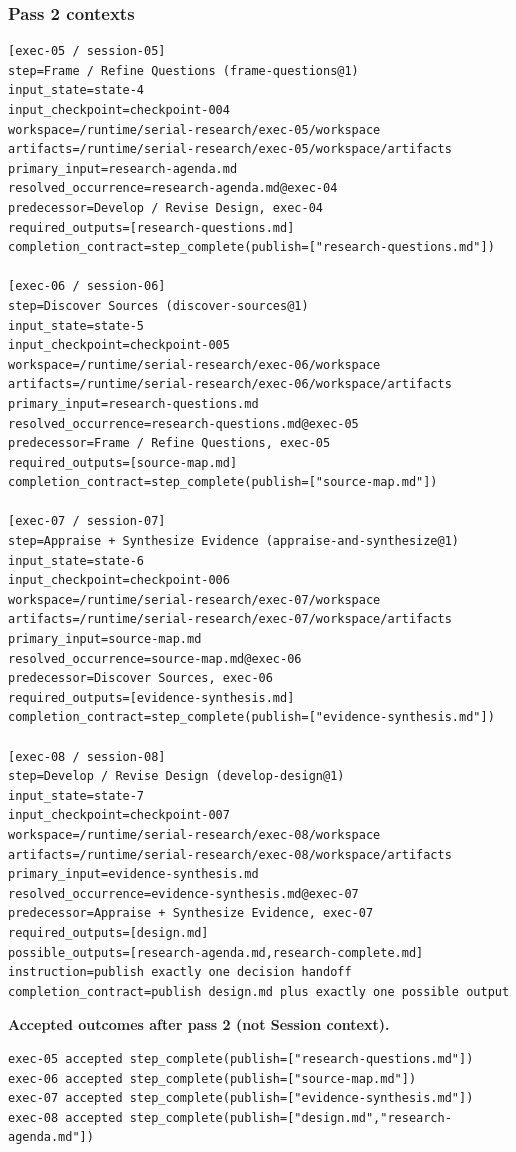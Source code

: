 \documentclass[11pt]{article}
\begin{document}
\subsubsection{Pass 2 contexts}

\begin{lstlisting}[style=playbook,basicstyle=\ttfamily\tiny]
[exec-05 / session-05]
step=Frame / Refine Questions (frame-questions@1)
input_state=state-4
input_checkpoint=checkpoint-004
workspace=/runtime/serial-research/exec-05/workspace
artifacts=/runtime/serial-research/exec-05/workspace/artifacts
primary_input=research-agenda.md
resolved_occurrence=research-agenda.md@exec-04
predecessor=Develop / Revise Design, exec-04
required_outputs=[research-questions.md]
completion_contract=step_complete(publish=["research-questions.md"])

[exec-06 / session-06]
step=Discover Sources (discover-sources@1)
input_state=state-5
input_checkpoint=checkpoint-005
workspace=/runtime/serial-research/exec-06/workspace
artifacts=/runtime/serial-research/exec-06/workspace/artifacts
primary_input=research-questions.md
resolved_occurrence=research-questions.md@exec-05
predecessor=Frame / Refine Questions, exec-05
required_outputs=[source-map.md]
completion_contract=step_complete(publish=["source-map.md"])

[exec-07 / session-07]
step=Appraise + Synthesize Evidence (appraise-and-synthesize@1)
input_state=state-6
input_checkpoint=checkpoint-006
workspace=/runtime/serial-research/exec-07/workspace
artifacts=/runtime/serial-research/exec-07/workspace/artifacts
primary_input=source-map.md
resolved_occurrence=source-map.md@exec-06
predecessor=Discover Sources, exec-06
required_outputs=[evidence-synthesis.md]
completion_contract=step_complete(publish=["evidence-synthesis.md"])

[exec-08 / session-08]
step=Develop / Revise Design (develop-design@1)
input_state=state-7
input_checkpoint=checkpoint-007
workspace=/runtime/serial-research/exec-08/workspace
artifacts=/runtime/serial-research/exec-08/workspace/artifacts
primary_input=evidence-synthesis.md
resolved_occurrence=evidence-synthesis.md@exec-07
predecessor=Appraise + Synthesize Evidence, exec-07
required_outputs=[design.md]
possible_outputs=[research-agenda.md,research-complete.md]
instruction=publish exactly one decision handoff
completion_contract=publish design.md plus exactly one possible output
\end{lstlisting}

\noindent\textbf{Accepted outcomes after pass 2 (not Session context).}
\begin{lstlisting}[style=playbook,basicstyle=\ttfamily\scriptsize]
exec-05 accepted step_complete(publish=["research-questions.md"])
exec-06 accepted step_complete(publish=["source-map.md"])
exec-07 accepted step_complete(publish=["evidence-synthesis.md"])
exec-08 accepted step_complete(publish=["design.md","research-agenda.md"])
\end{lstlisting}
\end{document}
